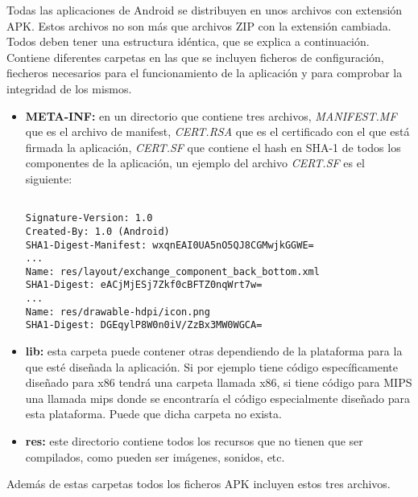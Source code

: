 Todas las aplicaciones de Android se distribuyen en unos archivos con extensión APK. Estos archivos no son más que archivos ZIP con la extensión cambiada. Todos deben tener una estructura idéntica, que se explica a continuación. Contiene diferentes carpetas en las que se incluyen ficheros de configuración, fiecheros necesarios para el funcionamiento de la aplicación y para comprobar la integridad de los mismos.

\begin{itemize}

\item \textbf{META-INF:} en un directorio que contiene tres archivos, \textit{MANIFEST.MF} que es el archivo de manifest, \textit{CERT.RSA} que es el certificado con el que está firmada la aplicación, \textit{CERT.SF} que contiene el hash en SHA-1 de todos los componentes de la aplicación, un ejemplo del archivo \textit{CERT.SF} es el siguiente:

\begin{verbatim}

Signature-Version: 1.0
Created-By: 1.0 (Android)
SHA1-Digest-Manifest: wxqnEAI0UA5nO5QJ8CGMwjkGGWE=
...
Name: res/layout/exchange_component_back_bottom.xml
SHA1-Digest: eACjMjESj7Zkf0cBFTZ0nqWrt7w=
...
Name: res/drawable-hdpi/icon.png
SHA1-Digest: DGEqylP8W0n0iV/ZzBx3MW0WGCA=
\end{verbatim}

\item \textbf{lib:} esta carpeta puede contener otras dependiendo de la plataforma para la que esté diseñada la aplicación. Si por ejemplo tiene código específicamente diseñado para x86 tendrá una carpeta llamada x86, si tiene código para MIPS una llamada mips donde se encontraría el código especialmente diseñado para esta plataforma. Puede que dicha carpeta no exista.

\item \textbf{res:} este directorio contiene todos los recursos que no tienen que ser compilados, como pueden ser imágenes, sonidos, etc.

\end{itemize}

Además de estas carpetas todos los ficheros APK incluyen estos tres archivos.

